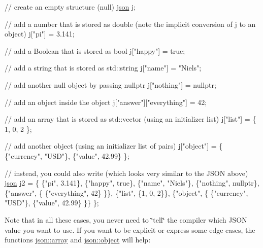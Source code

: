 \begin{DoxyCode}
\textcolor{comment}{// create an empty structure (null)}
\hyperlink{a00025}{json} j;

\textcolor{comment}{// add a number that is stored as double (note the implicit conversion of j to an object)}
j[\textcolor{stringliteral}{"pi"}] = 3.141;

\textcolor{comment}{// add a Boolean that is stored as bool}
j[\textcolor{stringliteral}{"happy"}] = \textcolor{keyword}{true};

\textcolor{comment}{// add a string that is stored as std::string}
j[\textcolor{stringliteral}{"name"}] = \textcolor{stringliteral}{"Niels"};

\textcolor{comment}{// add another null object by passing nullptr}
j[\textcolor{stringliteral}{"nothing"}] = \textcolor{keyword}{nullptr};

\textcolor{comment}{// add an object inside the object}
j[\textcolor{stringliteral}{"answer"}][\textcolor{stringliteral}{"everything"}] = 42;

\textcolor{comment}{// add an array that is stored as std::vector (using an initializer list)}
j[\textcolor{stringliteral}{"list"}] = \{ 1, 0, 2 \};

\textcolor{comment}{// add another object (using an initializer list of pairs)}
j[\textcolor{stringliteral}{"object"}] = \{ \{\textcolor{stringliteral}{"currency"}, \textcolor{stringliteral}{"USD"}\}, \{\textcolor{stringliteral}{"value"}, 42.99\} \};

\textcolor{comment}{// instead, you could also write (which looks very similar to the JSON above)}
\hyperlink{a00025}{json} j2 = \{
  \{\textcolor{stringliteral}{"pi"}, 3.141\},
  \{\textcolor{stringliteral}{"happy"}, \textcolor{keyword}{true}\},
  \{\textcolor{stringliteral}{"name"}, \textcolor{stringliteral}{"Niels"}\},
  \{\textcolor{stringliteral}{"nothing"}, \textcolor{keyword}{nullptr}\},
  \{\textcolor{stringliteral}{"answer"}, \{
    \{\textcolor{stringliteral}{"everything"}, 42\}
  \}\},
  \{\textcolor{stringliteral}{"list"}, \{1, 0, 2\}\},
  \{\textcolor{stringliteral}{"object"}, \{
    \{\textcolor{stringliteral}{"currency"}, \textcolor{stringliteral}{"USD"}\},
    \{\textcolor{stringliteral}{"value"}, 42.99\}
  \}\}
\};
\end{DoxyCode}


Note that in all these cases, you never need to \char`\"{}tell\char`\"{} the compiler which J\+S\+ON value you want to use. If you want to be explicit or express some edge cases, the functions {\ttfamily \hyperlink{a00025_a5685815624b086caa532f41e853d4b0f}{json\+::array}} and {\ttfamily \hyperlink{a00025_ad25b2f8c21e241e2d63455537a9294ff}{json\+::object}} will help\+:


